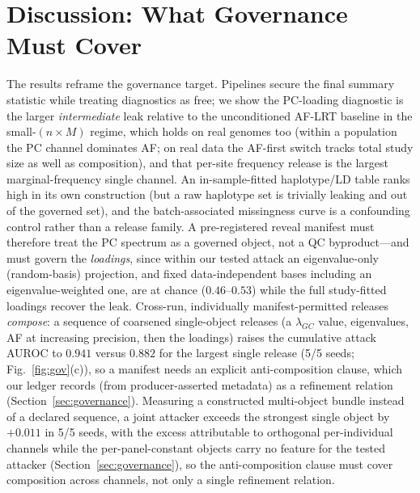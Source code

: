 \documentclass[11pt]{article}
\begin{document}
\section{Discussion: What Governance Must Cover}
\label{sec:discussion}
The results reframe the governance target. Pipelines secure the final summary
statistic while treating diagnostics as free; we show the PC-loading diagnostic
is the larger \emph{intermediate} leak relative to the unconditioned AF-LRT
baseline in the small-$(n{\times}M)$ regime, which
holds on real genomes too (within a population the PC channel dominates AF;
on real data the AF-first switch tracks total study size as well as composition),
and that per-site
frequency release is the largest marginal-frequency single channel. An
in-sample-fitted haplotype/LD table ranks high in its own construction (but a
raw haplotype set is trivially leaking and out of the governed set), and the
batch-associated missingness curve is a confounding control rather than a
release family. A pre-registered reveal
manifest must therefore treat the PC spectrum as a governed object, not a QC
byproduct---and must govern the \emph{loadings}, since within our tested attack
an eigenvalue-only (random-basis) projection, and fixed data-independent bases
including an eigenvalue-weighted one, are at chance ($0.46$--$0.53$) while the full
study-fitted loadings recover the leak. Cross-run, individually
manifest-permitted releases \emph{compose}: a sequence of coarsened single-object
releases (a $\lambda_{GC}$ value, eigenvalues, AF at increasing precision, then
the loadings) raises the cumulative attack AUROC to $0.941$ versus $0.882$ for
the largest single release (5/5 seeds; Fig.~\ref{fig:gov}(c)), so a manifest
needs an explicit anti-composition clause, which our ledger records (from
producer-asserted metadata) as a refinement relation (Section~\ref{sec:governance}).
Measuring a constructed multi-object bundle instead of a declared sequence, a
joint attacker exceeds the strongest single object by $+0.011$ in 5/5 seeds, with
the excess attributable to orthogonal per-individual channels while the
per-panel-constant objects carry no feature for the tested attacker
(Section~\ref{sec:governance}), so the
anti-composition clause must cover composition across channels, not only a single
refinement relation.
\end{document}

